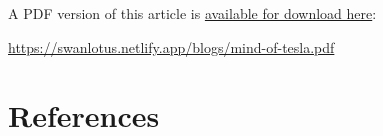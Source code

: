\documentclass[
  a4paper,
]{article}
\begin{document}
\noindent A PDF version of this article is
\href{./mind-of-tesla.pdf}{available for download here}:

\begin{small}

\begin{sffamily}

\url{https://swanlotus.netlify.app/blogs/mind-of-tesla.pdf}

\end{sffamily}

\end{small}

\hypertarget{bibliography}{%
\section*{References}\label{bibliography}}
\end{document}
